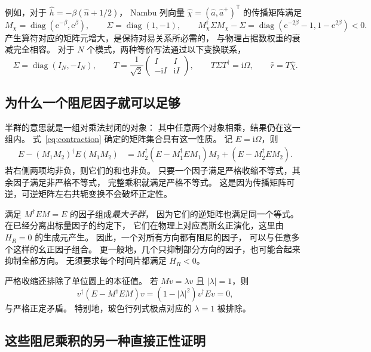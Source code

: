 \documentclass[UTF8,11pt,a4paper,fontset=fandol]{ctexart}
\newcommand{\diag}{\operatorname{diag}}
\newcommand{\ee}{\mathrm e}
\newcommand{\ii}{\mathrm i}
\newcommand{\trans}{\mathsf T}
\numberwithin{equation}{section}
\begin{document}
例如，对于 $\hat h=-\beta(\hat n+1/2)$，
Nambu 列向量 $\hat\chi=(\hat a,\hat a^+)^\trans$ 的传播矩阵满足
\begin{equation}
 M_\chi=\diag(\ee^{-\beta},\ee^{\beta}),\qquad
 \Sigma=\diag(1,-1),\qquad
 M_\chi^\dagger\Sigma M_\chi-\Sigma
 =\diag(\ee^{-2\beta}-1,1-\ee^{2\beta})<0.
 \label{eq:oscillator_contraction}
\end{equation}
产生算符对应的矩阵元增大，是保持对易关系所必需的，
与物理占据数权重的衰减完全相容。
对于 $N$ 个模式，两种等价写法通过以下变换联系，
\begin{equation}
 \Sigma=\diag(I_N,-I_N),\qquad
 T=\frac1{\sqrt2}\begin{pmatrix}I&I\\-\ii I&\ii I\end{pmatrix},
 \qquad T\Sigma T^\dagger=\ii\Omega,
 \qquad \hat r=T\hat\chi.
 \label{eq:metric_dictionary}
\end{equation}

\subsection{为什么一个阻尼因子就可以足够}

半群的意思就是一组对乘法封闭的对象：
其中任意两个对象相乘，结果仍在这一组内。
式~\eqref{eq:contraction} 确定的矩阵集合具有这一性质。
记 $E=\ii\Omega$，则
\begin{align}
 E-(M_1M_2)^\dagger E(M_1M_2)
 &=M_2^\dagger(E-M_1^\dagger EM_1)M_2
   +(E-M_2^\dagger EM_2).
 \label{eq:product_contraction}
\end{align}
若右侧两项均非负，则它们的和也非负。
只要一个因子满足严格收缩不等式，其余因子满足非严格不等式，
完整乘积就满足严格不等式。
这是因为传播矩阵可逆，可逆矩阵左右共轭变换不会破坏正定性。

满足 $M^\dagger EM=E$ 的因子组成\emph{最大子群}，
因为它们的逆矩阵也满足同一个等式。
在已经分离出标量因子的约定下，
它们在物理上对应高斯幺正演化，这里由 $H_R=0$ 的生成元产生。
因此，一个对所有方向都有阻尼的因子，
可以与任意多个这样的幺正因子组合。
更一般地，几个只抑制部分方向的因子，也可能合起来抑制全部方向。
无须要求每个时间片都满足 $H_R<0$。

严格收缩还排除了单位圆上的本征值。
若 $Mv=\lambda v$ 且 $|\lambda|=1$，则
\begin{equation}
 v^\dagger(E-M^\dagger EM)v=(1-|\lambda|^2)v^\dagger Ev=0,
\end{equation}
与严格正定矛盾。
特别地，玻色行列式极点对应的 $\lambda=1$ 被排除。

\subsection{这些阻尼乘积的另一种直接正性证明}
\end{document}
